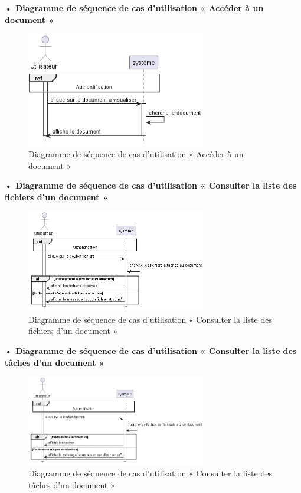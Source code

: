 \textbf{•	Diagramme de séquence de cas d'utilisation « Accéder à un document  »}
\begin{figure}[H]
  \centering
  \includegraphics[width=0.7\textwidth]{out/diagrams/documents/preview/preview_document}
  \caption{Diagramme de séquence de cas d'utilisation « Accéder à un document  »}
  \label{fig:sequence_Accederaundocument}
\end{figure}
\textbf{•	Diagramme de séquence de cas d'utilisation « Consulter la liste des fichiers d'un document  »}
\begin{figure}[H]
  \centering
  \includegraphics[width=0.7\textwidth]{out/diagrams/documents/previewFiles/preview_files_document}
  \caption{Diagramme de séquence de cas d'utilisation « Consulter la liste des fichiers d'un document  »}
  \label{fig:sequence_previewFiles}
\end{figure}
\textbf{•	Diagramme de séquence de cas d'utilisation « Consulter la liste des tâches d'un document  »}
\begin{figure}[H]
  \centering
  \includegraphics[width=0.7\textwidth]{out/diagrams/documents/previewTasks/preview_tasks_document}
  \caption{Diagramme de séquence de cas d'utilisation « Consulter la liste des tâches d'un document  »}
  \label{fig:sequence_previewTasks}
\end{figure}
